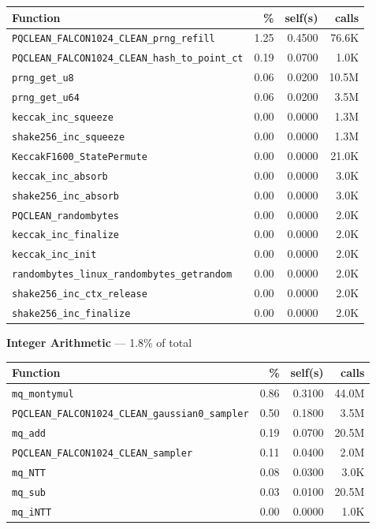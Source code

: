 \documentclass[11pt,a4paper]{article}
\begin{document}
\begin{longtable}{p{7.5cm}rrr}
\toprule
Function & \% & self(s) & calls \\
\midrule
\endhead
  \texttt{PQCLEAN\_FALCON1024\_CLEAN\_prng\_refill} & 1.25 & 0.4500 & 76.6K \\
  \texttt{PQCLEAN\_FALCON1024\_CLEAN\_hash\_to\_point\_ct} & 0.19 & 0.0700 & 1.0K \\
  \texttt{prng\_get\_u8} & 0.06 & 0.0200 & 10.5M \\
  \texttt{prng\_get\_u64} & 0.06 & 0.0200 & 3.5M \\
  \texttt{keccak\_inc\_squeeze} & 0.00 & 0.0000 & 1.3M \\
  \texttt{shake256\_inc\_squeeze} & 0.00 & 0.0000 & 1.3M \\
  \texttt{KeccakF1600\_StatePermute} & 0.00 & 0.0000 & 21.0K \\
  \texttt{keccak\_inc\_absorb} & 0.00 & 0.0000 & 3.0K \\
  \texttt{shake256\_inc\_absorb} & 0.00 & 0.0000 & 3.0K \\
  \texttt{PQCLEAN\_randombytes} & 0.00 & 0.0000 & 2.0K \\
  \texttt{keccak\_inc\_finalize} & 0.00 & 0.0000 & 2.0K \\
  \texttt{keccak\_inc\_init} & 0.00 & 0.0000 & 2.0K \\
  \texttt{randombytes\_linux\_randombytes\_getrandom} & 0.00 & 0.0000 & 2.0K \\
  \texttt{shake256\_inc\_ctx\_release} & 0.00 & 0.0000 & 2.0K \\
  \texttt{shake256\_inc\_finalize} & 0.00 & 0.0000 & 2.0K \\
\bottomrule
\end{longtable}

\noindent\colorbox{intcolor}{\strut \textbf{Integer Arithmetic} --- 1.8\% of total}
\vspace{2pt}

\begin{longtable}{p{7.5cm}rrr}
\toprule
Function & \% & self(s) & calls \\
\midrule
\endhead
  \texttt{mq\_montymul} & 0.86 & 0.3100 & 44.0M \\
  \texttt{PQCLEAN\_FALCON1024\_CLEAN\_gaussian0\_sampler} & 0.50 & 0.1800 & 3.5M \\
  \texttt{mq\_add} & 0.19 & 0.0700 & 20.5M \\
  \texttt{PQCLEAN\_FALCON1024\_CLEAN\_sampler} & 0.11 & 0.0400 & 2.0M \\
  \texttt{mq\_NTT} & 0.08 & 0.0300 & 3.0K \\
  \texttt{mq\_sub} & 0.03 & 0.0100 & 20.5M \\
  \texttt{mq\_iNTT} & 0.00 & 0.0000 & 1.0K \\
\bottomrule
\end{longtable}
\end{document}
